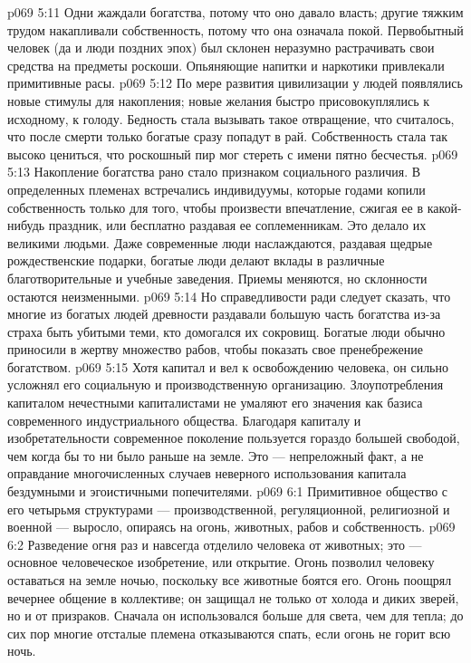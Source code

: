 \vs p069 5:11 \pc {}\bibnobreakspace {} Одни жаждали богатства, потому что оно давало власть; другие тяжким трудом накапливали собственность, потому что она означала покой. Первобытный человек (да и люди поздних эпох) был склонен неразумно растрачивать свои средства на предметы роскоши. Опьяняющие напитки и наркотики привлекали примитивные расы.
\vs p069 5:12 \pc По мере развития цивилизации у людей появлялись новые стимулы для накопления; новые желания быстро присовокуплялись к исходному, к голоду. Бедность стала вызывать такое отвращение, что считалось, что после смерти только богатые сразу попадут в рай. Собственность стала так высоко цениться, что роскошный пир мог стереть с имени пятно бесчестья.
\vs p069 5:13 Накопление богатства рано стало признаком социального различия. В определенных племенах встречались индивидуумы, которые годами копили собственность только для того, чтобы произвести впечатление, сжигая ее в какой\hyp{}нибудь праздник, или бесплатно раздавая ее соплеменникам. Это делало их великими людьми. Даже современные люди наслаждаются, раздавая щедрые рождественские подарки, богатые люди делают вклады в различные благотворительные и учебные заведения. Приемы меняются, но склонности остаются неизменными.
\vs p069 5:14 Но справедливости ради следует сказать, что многие из богатых людей древности раздавали большую часть богатства из\hyp{}за страха быть убитыми теми, кто домогался их сокровищ. Богатые люди обычно приносили в жертву множество рабов, чтобы показать свое пренебрежение богатством.
\vs p069 5:15 Хотя капитал и вел к освобождению человека, он сильно усложнял его социальную и производственную организацию. Злоупотребления капиталом нечестными капиталистами не умаляют его значения как базиса современного индустриального общества. Благодаря капиталу и изобретательности современное поколение пользуется гораздо большей свободой, чем когда бы то ни было раньше на земле. Это --- непреложный факт, а не оправдание многочисленных случаев неверного использования капитала бездумными и эгоистичными попечителями.
\vs p069 6:1 Примитивное общество с его четырьмя структурами --- производственной, регуляционной, религиозной и военной --- выросло, опираясь на огонь, животных, рабов и собственность.
\vs p069 6:2 Разведение огня раз и навсегда отделило человека от животных; это --- основное человеческое изобретение, или открытие. Огонь позволил человеку оставаться на земле ночью, поскольку все животные боятся его. Огонь поощрял вечернее общение в коллективе; он защищал не только от холода и диких зверей, но и от призраков. Сначала он использовался больше для света, чем для тепла; до сих пор многие отсталые племена отказываются спать, если огонь не горит всю ночь.
